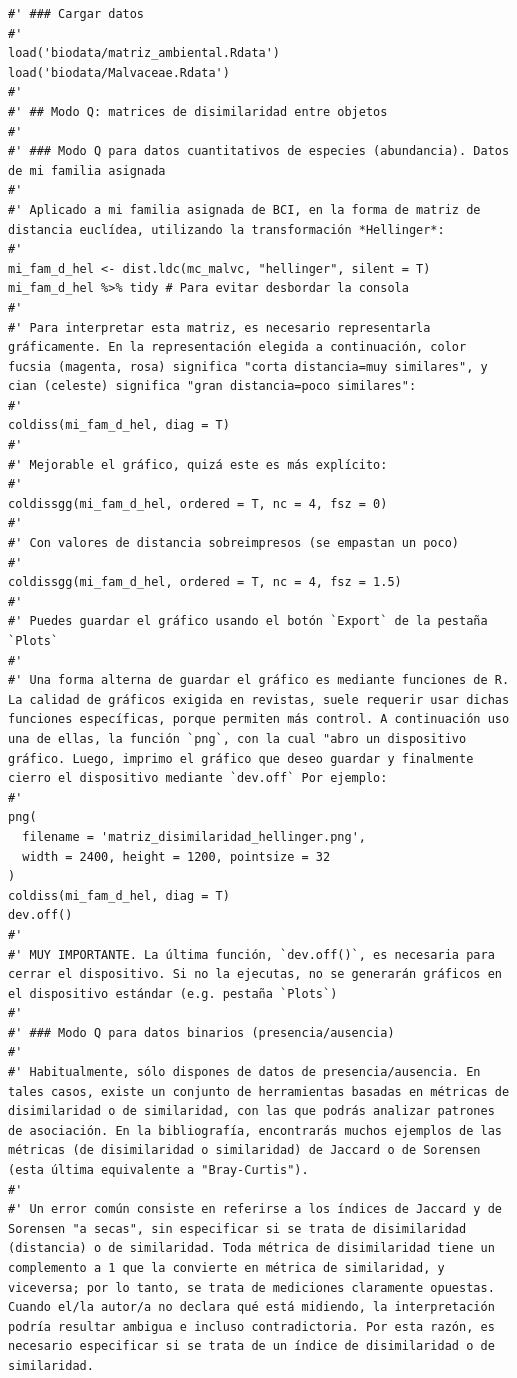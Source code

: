 \documentclass[11pt,]{article}
\begin{document}
\begin{verbatim}
#' ### Cargar datos
#' 
load('biodata/matriz_ambiental.Rdata')
load('biodata/Malvaceae.Rdata')
#' 
#' ## Modo Q: matrices de disimilaridad entre objetos
#' 
#' ### Modo Q para datos cuantitativos de especies (abundancia). Datos de mi familia asignada
#' 
#' Aplicado a mi familia asignada de BCI, en la forma de matriz de distancia euclídea, utilizando la transformación *Hellinger*:
#' 
mi_fam_d_hel <- dist.ldc(mc_malvc, "hellinger", silent = T)
mi_fam_d_hel %>% tidy # Para evitar desbordar la consola
#' 
#' Para interpretar esta matriz, es necesario representarla gráficamente. En la representación elegida a continuación, color fucsia (magenta, rosa) significa "corta distancia=muy similares", y cian (celeste) significa "gran distancia=poco similares":
#' 
coldiss(mi_fam_d_hel, diag = T)
#' 
#' Mejorable el gráfico, quizá este es más explícito:
#' 
coldissgg(mi_fam_d_hel, ordered = T, nc = 4, fsz = 0)
#' 
#' Con valores de distancia sobreimpresos (se empastan un poco)
#' 
coldissgg(mi_fam_d_hel, ordered = T, nc = 4, fsz = 1.5)
#' 
#' Puedes guardar el gráfico usando el botón `Export` de la pestaña `Plots`
#' 
#' Una forma alterna de guardar el gráfico es mediante funciones de R. La calidad de gráficos exigida en revistas, suele requerir usar dichas funciones específicas, porque permiten más control. A continuación uso una de ellas, la función `png`, con la cual "abro un dispositivo gráfico. Luego, imprimo el gráfico que deseo guardar y finalmente cierro el dispositivo mediante `dev.off` Por ejemplo:
#' 
png(
  filename = 'matriz_disimilaridad_hellinger.png',
  width = 2400, height = 1200, pointsize = 32
)
coldiss(mi_fam_d_hel, diag = T)
dev.off()
#' 
#' MUY IMPORTANTE. La última función, `dev.off()`, es necesaria para cerrar el dispositivo. Si no la ejecutas, no se generarán gráficos en el dispositivo estándar (e.g. pestaña `Plots`)
#' 
#' ### Modo Q para datos binarios (presencia/ausencia)
#' 
#' Habitualmente, sólo dispones de datos de presencia/ausencia. En tales casos, existe un conjunto de herramientas basadas en métricas de disimilaridad o de similaridad, con las que podrás analizar patrones de asociación. En la bibliografía, encontrarás muchos ejemplos de las métricas (de disimilaridad o similaridad) de Jaccard o de Sorensen (esta última equivalente a "Bray-Curtis").
#' 
#' Un error común consiste en referirse a los índices de Jaccard y de Sorensen "a secas", sin especificar si se trata de disimilaridad (distancia) o de similaridad. Toda métrica de disimilaridad tiene un complemento a 1 que la convierte en métrica de similaridad, y viceversa; por lo tanto, se trata de mediciones claramente opuestas. Cuando el/la autor/a no declara qué está midiendo, la interpretación podría resultar ambigua e incluso contradictoria. Por esta razón, es necesario especificar si se trata de un índice de disimilaridad o de similaridad.

\end{verbatim}
\end{document}
